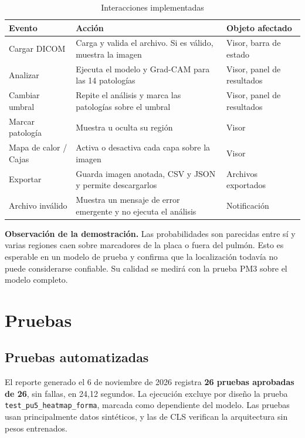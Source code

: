 \documentclass[11.5pt]{article}
\begin{document}
\begin{table}[H]
\centering
\small
\caption{Interacciones implementadas}
\label{tab:interacciones}
\begin{tabularx}{\textwidth}{L{3cm} X L{5cm}}
\toprule
Evento & Acción & Objeto afectado \\
\midrule
Cargar DICOM & Carga y valida el archivo. Si es válido, muestra la imagen & Visor, barra de estado \\
Analizar & Ejecuta el modelo y Grad-CAM para las 14 patologías & Visor, panel de resultados \\
Cambiar umbral & Repite el análisis y marca las patologías sobre el umbral & Visor, panel de resultados \\
Marcar patología & Muestra u oculta su región & Visor \\
Mapa de calor / Cajas & Activa o desactiva cada capa sobre la imagen & Visor \\
Exportar & Guarda imagen anotada, CSV y JSON y permite descargarlos & Archivos exportados \\
Archivo inválido & Muestra un mensaje de error emergente y no ejecuta el análisis & Notificación \\
\bottomrule
\end{tabularx}
\end{table}

\textbf{Observación de la demostración.} Las probabilidades son parecidas entre sí y varias regiones caen sobre marcadores de la placa o fuera del pulmón. Esto es esperable en un modelo de prueba y confirma que la localización todavía no puede considerarse confiable. Su calidad se medirá con la prueba PM3 sobre el modelo completo.

\section{Pruebas}
\label{sec:pruebas}

\subsection{Pruebas automatizadas}

El reporte generado el 6 de noviembre de 2026 registra \textbf{26 pruebas aprobadas de 26}, sin fallas, en 24,12 segundos. La ejecución excluye por diseño la prueba \texttt{test\_pu5\_heatmap\_forma}, marcada como dependiente del modelo. Las pruebas usan principalmente datos sintéticos, y las de CLS verifican la arquitectura sin pesos entrenados.
\end{document}
